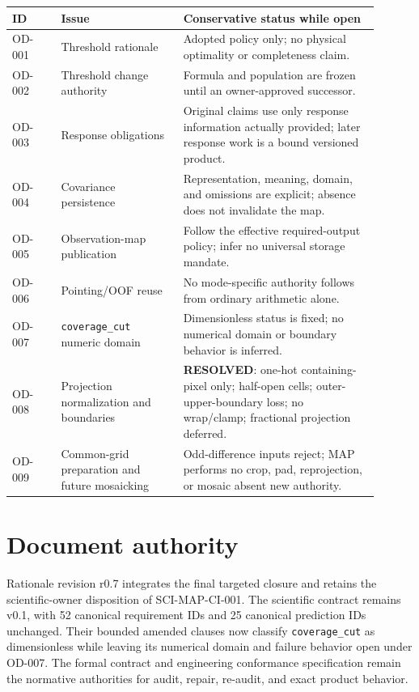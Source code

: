 \documentclass[10pt]{article}
\newcommand{\code}[1]{\nolinkurl{#1}}
\begin{document}
\begin{longtable}{L{0.12\linewidth}L{0.30\linewidth}L{0.48\linewidth}}
\toprule ID & Issue & Conservative status while open \\
\midrule
OD-001 & Threshold rationale & Adopted policy only; no physical optimality or completeness claim.\\
OD-002 & Threshold change authority & Formula and population are frozen until an owner-approved successor.\\
OD-003 & Response obligations & Original claims use only response information actually provided; later response work is a bound versioned product.\\
OD-004 & Covariance persistence & Representation, meaning, domain, and omissions are explicit; absence does not invalidate the map.\\
OD-005 & Observation-map publication & Follow the effective required-output policy; infer no universal storage mandate.\\
OD-006 & Pointing/OOF reuse & No mode-specific authority follows from ordinary arithmetic alone.\\
OD-007 & \code{coverage_cut} numeric domain & Dimensionless status is fixed; no numerical domain or boundary behavior is inferred.\\
OD-008 & Projection normalization and boundaries & \textbf{RESOLVED}: one-hot containing-pixel only; half-open cells; outer-upper-boundary loss; no wrap/clamp; fractional projection deferred.\\
OD-009 & Common-grid preparation and future mosaicking & Odd-difference inputs reject; MAP performs no crop, pad, reprojection, or mosaic absent new authority.\\
\bottomrule
\end{longtable}

\section{Document authority}
Rationale revision r0.7 integrates the final targeted closure and
retains the scientific-owner disposition of SCI-MAP-CI-001. The scientific contract
remains v0.1, with 52 canonical requirement IDs and 25 canonical prediction
IDs unchanged. Their bounded amended clauses now classify
\code{coverage_cut} as dimensionless while leaving its numerical domain and
failure behavior open under OD-007. The formal contract and engineering
conformance specification remain the normative authorities for audit,
repair, re-audit, and exact product behavior.
\end{document}
